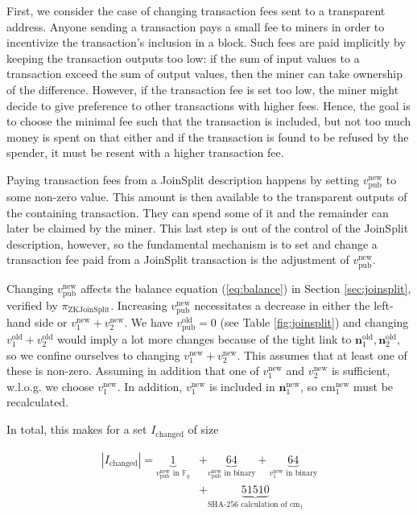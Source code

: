 \documentclass{article}
\begin{document}
First, we consider the case of changing transaction fees sent to a transparent address.
Anyone sending a transaction pays a small fee to miners in order to incentivize the transaction's inclusion in a block.
Such fees are paid implicitly by keeping the transaction outputs too low: if the sum of input values to a transaction exceed the sum of output values, then the miner can take ownership of the difference.
However, if the transaction fee is set too low, the miner might decide to give preference to other transactions with higher fees.
Hence, the goal is to choose the minimal fee such that the transaction is included, but not too much money is spent on that either and if the transaction is found to be refused by the spender, it must be resent with a higher transaction fee.

Paying transaction fees from a JoinSplit description happens by setting $v_\text{pub}^\text{new}$ to some non-zero value.
This amount is then available to the transparent outputs of the containing transaction.
They can spend some of it and the remainder can later be claimed by the miner.
This last step is out of the control of the JoinSplit description, however, so the fundamental mechanism is to set and change a transaction fee paid from a JoinSplit transaction is the adjustment of $v_\text{pub}^\text{new}$.

Changing $v_\text{pub}^\text{new}$ affects the balance equation (\ref{eq:balance}) in Section \ref{sec:joinsplit}, verified by $\pi_\text{ZKJoinSplit}$.
Increasing $v_\text{pub}^\text{new}$ necessitates a decrease in either the left-hand side or $v_1^\text{new} + v_2^\text{new}$.
We have $v_\text{pub}^\text{old} = 0$ (see Table \ref{fig:joinsplit}) and changing $v_1^\text{old} + v_2^\text{old}$ would imply a lot more changes because of the tight link to $\boldsymbol{n}^\text{old}_1,\boldsymbol{n}^\text{old}_2$, so we confine ourselves to changing $v_1^\text{new} + v_2^\text{new}$.
This assumes that at least one of these is non-zero.
Assuming in addition that one of $v_1^\text{new}$ and $v_2^\text{new}$ is sufficient, w.l.o.g. we choose $v_1^\text{new}$.
In addition, $v_1^\text{new}$ is included in $\boldsymbol{n}^\text{new}_1$, so $\text{cm}_1^\text{new}$ must be recalculated.

In total, this makes for a set $I_\text{changed}$ of size

\begin{align*}
        |I_\text{changed}| = \underbrace{1}_\text{$v_\text{pub}^\text{new}$ in $\mathbb{F}_q$} &+ \underbrace{64}_\text{$v_\text{pub}^\text{new}$ in binary} + \underbrace{64}_\text{$v_1^\text{new}$ in binary} \\
        &+ \underbrace{51510}_\text{SHA-256 calculation of $\text{cm}_1$}
\end{align*}
\end{document}
